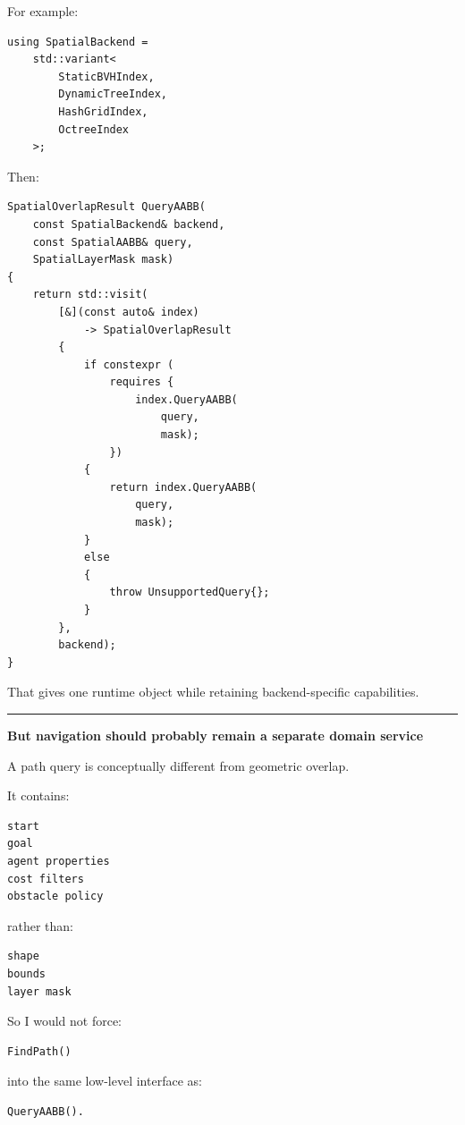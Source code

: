 For example:

\begin{verbatim}
using SpatialBackend =
    std::variant<
        StaticBVHIndex,
        DynamicTreeIndex,
        HashGridIndex,
        OctreeIndex
    >;
\end{verbatim}

Then:

\begin{verbatim}
SpatialOverlapResult QueryAABB(
    const SpatialBackend& backend,
    const SpatialAABB& query,
    SpatialLayerMask mask)
{
    return std::visit(
        [&](const auto& index)
            -> SpatialOverlapResult
        {
            if constexpr (
                requires {
                    index.QueryAABB(
                        query,
                        mask);
                })
            {
                return index.QueryAABB(
                    query,
                    mask);
            }
            else
            {
                throw UnsupportedQuery{};
            }
        },
        backend);
}
\end{verbatim}

That gives one runtime object while retaining backend-specific capabilities.

\begin{center}\rule{0.5\linewidth}{0.5pt}\end{center}

\textbf{But navigation should probably remain a separate domain service}

A path query is conceptually different from geometric overlap.

It contains:

\begin{verbatim}
start
goal
agent properties
cost filters
obstacle policy
\end{verbatim}

rather than:

\begin{verbatim}
shape
bounds
layer mask
\end{verbatim}

So I would not force:

\begin{verbatim}
FindPath()
\end{verbatim}

into the same low-level interface as:

\begin{verbatim}
QueryAABB().
\end{verbatim}

